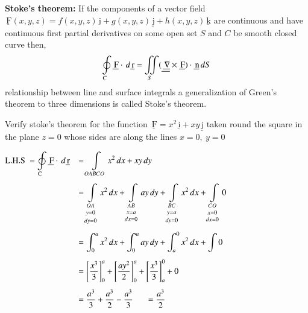 \documentclass[11pt]{extarticle}
\renewcommand{\vec}[1]{\underline{\,\mathrm{#1}}}
\newcommand{\dx}{{\,dx}}
\newcommand{\dy}{{\,dy}}
\newcommand{\dS}{{\,dS}}
\newcommand{\dvr}{{\,d\vec{r}}}
\renewcommand{\i}{\vec{i}}
\renewcommand{\j}{\vec{j}}
\let\oldnabla\nabla
\renewcommand{\nabla}{\vec{\oldnabla}}
\newcommand{\F}{\vec{F}}
\newcommand{\br}{\\[0.5ex]}
\newcommand{\osint}[1][]{\oint\displaylimits_\mathrm{#1}}
\newcommand{\mint}{\int\displaylimits}
\newcommand{\miint}{\iint\displaylimits}
\begin{document}
 
\pagebreak
{}

\textbf{Stoke's theorem:} If the components of a vector field $\vec{F}(x,y,z) = f(x,y,z)\vec{i}+g(x,y,z)\vec{j}+h(x,y,z)\vec{k}$ are continuous and have continuous first partial derivatives on some open set $S$ and $C$ be smooth closed curve then, $$\osint[C]\vec{F} \cdot \dvr = \miint_S(\nabla\times\F) \cdot \vec{n} \dS$$
relationship between line and surface integrals a generalization of Green's theorem to three dimensions is called Stoke's theorem.

\textbf{} Verify stoke's theorem for the function $\F=x^2\i + xy\j$ taken round the square in the plane $z=0$ whose sides are along the lines $x=0,\ y=0$

\begin{minipage}[t]{0.66\linewidth}
\noindent
\begin{adjustbox}{valign=t}
   $\begin{aligned}
      \text{L.H.S } = \osint[C]\vec{F} \cdot \dvr \tab
      & = \mint_{OABCO} x^2\dx + xy\dy\\[1ex]
      & = 
      \mint_{\substack{OA \br y=0 \br dy=0}} x^2\dx+
      \mint_{\substack{AB \br x=a \br dx=0}} ay\dy+
      \mint_{\substack{BC \br y=a \br dy=0}} x^2\dx+
      \mint_{\substack{CO \br x=0 \br dx=0}} 0\\[1ex]
      & = \int_0^a x^2\dx+ \int_0^a ay\dy+ \int_a^0 x^2\dx + \int 0\\[1ex]
      & = \left[\frac{x^3}{3}\right]_0^a + \left[\frac{ay^2}{2}\right]_0^a+\left[\frac{x^3}{3}\right]_a^0 + 0\\[1ex]
      & = \frac{a^3}{3}+\frac{a^3}{2}-\frac{a^3}{3} \tabs = \frac{a^3}{2}
   \end{aligned}$
\end{adjustbox}
\end{minipage}\hspace{0.5ex}
\end{document}
